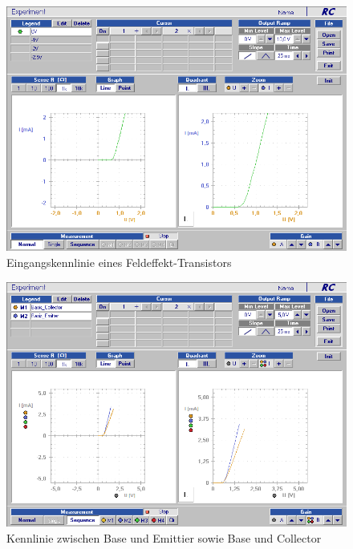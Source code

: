 \documentclass[12pt,a4paper]{article}
\begin{document}
\begin{figure}[H]
	\centering
	\includegraphics[scale=0.45]{./data/Braun_Kurz_PS8/FET_Eingangskennlinie.png}
	\caption{Eingangskennlinie eines Feldeffekt-Transistors}
	\label{fig:eingangskennlinien_fet}
\end{figure}

\begin{figure}[H]
	\centering
	\includegraphics[scale=0.45]{./data/Braun_Kurz_PS8/Kennlinien_Emitter_Collector.png}
	\caption{Kennlinie zwischen Base und Emittier sowie Base und Collector}
	\label{fig:kenn_emit_coll}
\end{figure}
\end{document}
